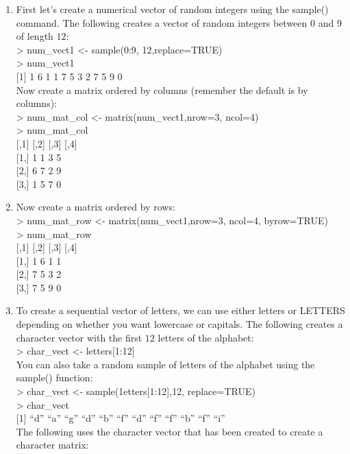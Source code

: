 \documentclass[
]{book}
\begin{document}
\begin{enumerate}
\def\labelenumi{\arabic{enumi}.}
\item
  First let's create a numerical vector of random integers using the sample() command. The following creates a vector of random integers between \(0\) and \(9\) of length \(12\):\\
  \textgreater{} num\_vect1 \textless- sample(0:9, 12,replace=TRUE)\\
  \textgreater{} num\_vect1\\
  {[}1{]} 1 6 1 1 7 5 3 2 7 5 9 0\\
  Now create a matrix ordered by columns (remember the default is by columns):\\
  \textgreater{} num\_mat\_col \textless- matrix(num\_vect1,nrow=3, ncol=4)\\
  \textgreater{} num\_mat\_col\\
  {[},1{]} {[},2{]} {[},3{]} {[},4{]}\\
  {[}1,{]} 1 1 3 5\\
  {[}2,{]} 6 7 2 9\\
  {[}3,{]} 1 5 7 0
\item
  Now create a matrix ordered by rows:\\
  \textgreater{} num\_mat\_row \textless- matrix(num\_vect1,nrow=3, ncol=4, byrow=TRUE)\\
  \textgreater{} num\_mat\_row\\
  {[},1{]} {[},2{]} {[},3{]} {[},4{]}\\
  {[}1,{]} 1 6 1 1\\
  {[}2,{]} 7 5 3 2\\
  {[}3,{]} 7 5 9 0
\item
  To create a sequential vector of letters, we can use either letters or LETTERS depending on whether you want lowercase or capitals. The following creates a character vector with the first \(12\) letters of the alphabet:\\
  \textgreater{} char\_vect \textless- letters{[}1:12{]}\\
  You can also take a random sample of letters of the alphabet using the sample() function:\\
  \textgreater{} char\_vect \textless- sample(1etters{[}1:12{]},12, replace=TRUE)\\
  \textgreater{} char\_vect\\
  {[}1{]} ``d'' ``a'' ``g'' ``d'' ``b'' ``f'' ``d'' ``f'' ``f'' ``b'' ``f'' ``i''\\
  The following uses the character vector that has been created to create a character matrix:\\

\end{enumerate}
\end{document}
